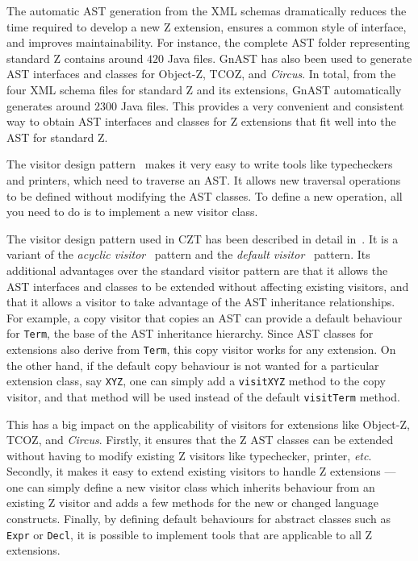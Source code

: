 \documentclass{llncs}
\newcommand{\Circus}{{\sf\slshape Circus}}
\newcommand{\Interface}[1]{\texttt{#1}}
\begin{document}
  The automatic AST generation from the XML schemas dramatically
  reduces the time required to develop a new Z extension, ensures a
  common style of interface, and improves maintainability.  For
  instance, the complete AST folder representing standard Z contains
  around $420$ Java files.  GnAST has also been used to generate AST
  interfaces and classes for Object-Z, TCOZ, and \Circus.  In total,
  from the four XML schema files for standard Z and its extensions,
  GnAST automatically generates around $2300$ Java files.  This
  provides a very convenient and consistent way to obtain AST interfaces
  and classes for Z extensions that fit well into the AST for standard Z.

  The visitor design pattern~\cite{GamEA:95,MaiCha:01} makes it very
  easy to write tools like typecheckers and printers, which need to
  traverse an AST.  It allows new traversal operations to be defined
  without modifying the AST classes.  To define a new operation, all
  you need to do is to implement a new visitor class.

  The visitor design pattern used in CZT has been described in detail
  in~\cite{czt}.  It is a variant of the \emph{acyclic
  visitor}~\cite{Mar:97} pattern and the \emph{default
  visitor}~\cite{Nor:97} pattern.  Its additional advantages over the
  standard visitor pattern are that it allows the AST interfaces and
  classes to be extended without affecting existing visitors, and that
  it allows a visitor to take advantage of the AST inheritance
  relationships.  For example, a copy visitor that copies an AST can
  provide a default behaviour for \Interface{Term}, the base of the
  AST inheritance hierarchy.  Since AST classes for extensions also
  derive from \Interface{Term}, this copy visitor works for any
  extension.  On the other hand, if the default copy behaviour is not
  wanted for a particular extension class, say \texttt{XYZ}, one can
  simply add a \texttt{visitXYZ} method to the copy visitor, and that
  method will be used instead of the default \texttt{visitTerm}
  method.

  This has a big impact on the applicability of visitors for
  extensions like Object-Z, TCOZ, and \Circus.  Firstly, it ensures
  that the Z AST classes can be extended without having to modify
  existing Z visitors like typechecker, printer, \textit{etc}.
  Secondly, it makes it easy to extend existing visitors
  to handle Z extensions --- one can simply define a new visitor class
  which inherits behaviour from an existing Z visitor and adds a few
  methods for the new or changed language constructs.
  Finally, by defining default behaviours for abstract classes such as
  \texttt{Expr} or \texttt{Decl}, it is possible to implement tools
  that are applicable to all Z extensions.
\end{document}
